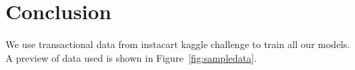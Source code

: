 \section{Conclusion}
We use transactional data from instacart kaggle challenge to train all our models. A preview of data used is 
shown in Figure~\ref{fig:sampledata}. 